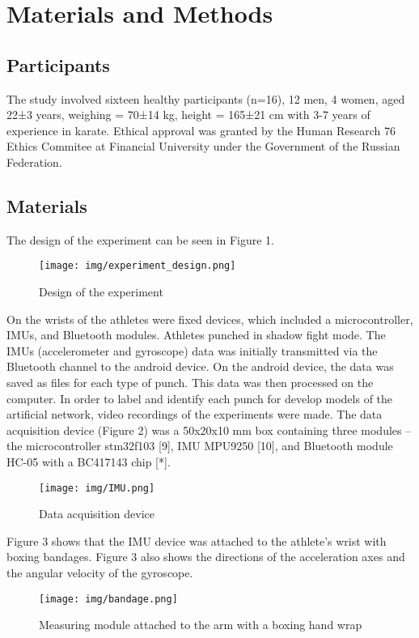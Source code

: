 \documentclass[sport,article,submit,moreauthors,pdftex]{Definitions/mdpi}
\begin{document}
\section{Materials and Methods}

\subsection{Participants}
The study involved sixteen healthy participants (n=16), 12 men, 4 women, aged 22±3 years, weighing = 70±14 kg, height = 165±21 cm with 3-7 years of experience in karate. Ethical approval was granted by the Human Research 76 Ethics Commitee at Financial University under the Government of the Russian Federation.

\subsection{Materials}
The design of the experiment can be seen in Figure 1.

\begin{figure}[H]
\texttt{[image: img/experiment\_design.png]}
\caption{Design of the experiment}
\end{figure}

On the wrists of the athletes were fixed devices, which included a microcontroller, IMUs, and Bluetooth modules. Athletes punched in shadow fight mode. The IMUs (accelerometer and gyroscope) data was initially transmitted via the Bluetooth channel to the android device. On the android device, the data was saved as files for each type of punch. This data was then processed on the computer. In order to label and identify each punch for develop models of the artificial network, video recordings of the experiments were made.
The data acquisition device (Figure 2) was a 50x20x10 mm box containing three modules – the microcontroller stm32f103 [9], IMU MPU9250 [10], and Bluetooth module HC-05 with a BC417143 chip [*].

\begin{figure}[H]
\texttt{[image: img/IMU.png]}
\caption{Data acquisition device}
\end{figure}

Figure 3 shows that the IMU device was attached to the athlete's wrist with boxing bandages. Figure 3 also shows the directions of the acceleration axes and the angular velocity of the gyroscope.

\begin{figure}[H]
\texttt{[image: img/bandage.png]}
\caption{Measuring module attached to the arm with a boxing hand wrap}
\end{figure}
\end{document}
